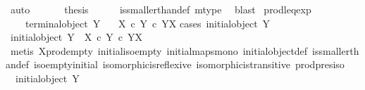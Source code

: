 \begin{isabellebody}
\ auto\ \isanewline
\ \ \isamarkupfalse%
\ \isamarkupfalse%
\ {\isacharquery}{\kern0pt}thesis\isanewline
\ \ \ \ \isamarkupfalse%
\ is{\isacharunderscore}{\kern0pt}smaller{\isacharunderscore}{\kern0pt}than{\isacharunderscore}{\kern0pt}def\ m{\isacharunderscore}{\kern0pt}type\ \isamarkupfalse%
\ blast\isanewline
{}\isamarkupfalse%
%
\endisatagproof
{\isafoldproof}%
%
\isadelimproof
\isanewline
%
\endisadelimproof
\isanewline
{}\isamarkupfalse%
\ prod{\isacharunderscore}{\kern0pt}leq{\isacharunderscore}{\kern0pt}exp{\isacharcolon}{\kern0pt}\isanewline
\ \ \ {\isachardoublequoteopen}{\isasymnot}\ terminal{\isacharunderscore}{\kern0pt}object\ Y{\isachardoublequoteclose}\isanewline
\ \ \ {\isachardoublequoteopen}X\ {\isasymtimes}\isactrlsub c\ Y\ {\isasymle}\isactrlsub c\ Y\isactrlbsup X\isactrlesup {\isachardoublequoteclose}\isanewline
%
\isadelimproof
%
\endisadelimproof
%
\isatagproof
{}\isamarkupfalse%
{\isacharparenleft}{\kern0pt}cases\ {\isachardoublequoteopen}initial{\isacharunderscore}{\kern0pt}object\ Y{\isachardoublequoteclose}{\isacharparenright}{\kern0pt}\isanewline
\ \ \isamarkupfalse%
\ {\isachardoublequoteopen}initial{\isacharunderscore}{\kern0pt}object\ Y\ {\isasymLongrightarrow}\ X\ {\isasymtimes}\isactrlsub c\ Y\ {\isasymle}\isactrlsub c\ Y\isactrlbsup X\isactrlesup {\isachardoublequoteclose}\isanewline
\ \ \ \ \isamarkupfalse%
\ {\isacharparenleft}{\kern0pt}metis\ X{\isacharunderscore}{\kern0pt}prod{\isacharunderscore}{\kern0pt}empty\ initial{\isacharunderscore}{\kern0pt}iso{\isacharunderscore}{\kern0pt}empty\ initial{\isacharunderscore}{\kern0pt}maps{\isacharunderscore}{\kern0pt}mono\ initial{\isacharunderscore}{\kern0pt}object{\isacharunderscore}{\kern0pt}def\ is{\isacharunderscore}{\kern0pt}smaller{\isacharunderscore}{\kern0pt}than{\isacharunderscore}{\kern0pt}def\ iso{\isacharunderscore}{\kern0pt}empty{\isacharunderscore}{\kern0pt}initial\ isomorphic{\isacharunderscore}{\kern0pt}is{\isacharunderscore}{\kern0pt}reflexive\ isomorphic{\isacharunderscore}{\kern0pt}is{\isacharunderscore}{\kern0pt}transitive\ prod{\isacharunderscore}{\kern0pt}pres{\isacharunderscore}{\kern0pt}iso{\isacharparenright}{\kern0pt}\isanewline
{}\isamarkupfalse%
\isanewline
\ \ \isamarkupfalse%
\ {\isachardoublequoteopen}{\isasymnot}\ initial{\isacharunderscore}{\kern0pt}object\ Y{\isachardoublequoteclose}\isanewline
\ \ \isamarkupfalse%

\end{isabellebody}
